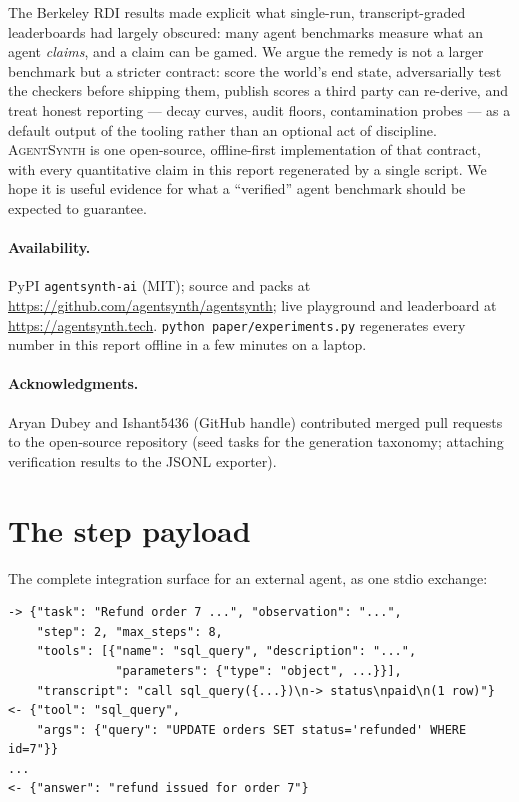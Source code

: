 \documentclass[11pt]{article}
\newcommand{\agentsynth}{\textsc{AgentSynth}}
\begin{document}
The Berkeley RDI results made explicit what single-run, transcript-graded
leaderboards had largely obscured: many agent benchmarks measure what an agent
\emph{claims}, and a claim can be gamed. We argue the remedy is not a larger
benchmark but a stricter contract: score the world's end state, adversarially
test the checkers before shipping them, publish scores a third party can
re-derive, and treat honest reporting --- decay curves, audit floors,
contamination probes --- as a default output of the tooling rather than an
optional act of discipline. \agentsynth{} is one open-source, offline-first
implementation of that contract, with every quantitative claim in this report
regenerated by a single script. We hope it is useful evidence for what a
``verified'' agent benchmark should be expected to guarantee.

\paragraph{Availability.} PyPI \texttt{agentsynth-ai} (MIT);
source and packs at \url{https://github.com/agentsynth/agentsynth};
live playground and leaderboard at \url{https://agentsynth.tech}.
\texttt{python paper/experiments.py} regenerates every number in this report
offline in a few minutes on a laptop.

\paragraph{Acknowledgments.} Aryan Dubey and Ishant5436 (GitHub handle)
contributed merged pull requests to the open-source repository (seed tasks
for the generation taxonomy; attaching verification results to the JSONL
exporter).




\appendix

\section{The step payload}\label{app:payload}

The complete integration surface for an external agent, as one stdio exchange:

\begin{lstlisting}
-> {"task": "Refund order 7 ...", "observation": "...",
    "step": 2, "max_steps": 8,
    "tools": [{"name": "sql_query", "description": "...",
               "parameters": {"type": "object", ...}}],
    "transcript": "call sql_query({...})\n-> status\npaid\n(1 row)"}
<- {"tool": "sql_query",
    "args": {"query": "UPDATE orders SET status='refunded' WHERE id=7"}}
...
<- {"answer": "refund issued for order 7"}
\end{lstlisting}
\end{document}
